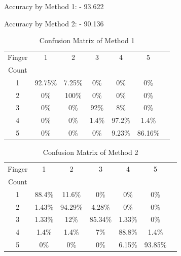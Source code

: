 \documentclass[conference]{IEEEtran}
\begin{document}
Accuracy by Method 1: - 93.622%

Accuracy by Method 2: - 90.136%
%
%

\begin{table}[h]
\caption{Confusion Matrix of Method 1}
\begin{center}
\begin{tabular}{|c|c|c|c|c|c|c|}
\hline
\multicolumn{1}{|c|}{Finger}
& \multicolumn{1}{|c|}{1}
& \multicolumn{1}{|c|}{2}
& \multicolumn{1}{|c|}{3}
& \multicolumn{1}{|c|}{4}
& \multicolumn{1}{|c|}{5}\\
Count &  &  &  &  &\\ \hline
1  &  92.75\%  &  7.25\%  & 0\%  & 0\% & 0\%\\ \hline
2  &  0\%  &  100\%  & 0\%  & 0\% & 0\%\\ \hline
3  &  0\%  &  0\%  & 92\%  & 8\% & 0\%\\ \hline
4  &  0\%  &  0\%  & 1.4\%  & 97.2\% & 1.4\%\\ \hline
5  &  0\%  &  0\%  & 0\%  & 9.23\% & 86.16\%\\ \hline
\end{tabular}
\label{table-tab2}
\end{center}
\end{table}

\begin{table}[h]
\caption{Confusion Matrix of Method 2}
\begin{center}
\begin{tabular}{|c|c|c|c|c|c|c|}
\hline
\multicolumn{1}{|c|}{Finger}
& \multicolumn{1}{|c|}{1}
& \multicolumn{1}{|c|}{2}
& \multicolumn{1}{|c|}{3}
& \multicolumn{1}{|c|}{4}
& \multicolumn{1}{|c|}{5}\\
Count &  &  &  &  &\\ \hline
1  &  88.4\%  &  11.6\%  & 0\%  & 0\% & 0\%\\ \hline
2  &  1.43\%  &  94.29\%  & 4.28\%  & 0\% & 0\%\\ \hline
3  &  1.33\%  &  12\%  & 85.34\%  & 1.33\% & 0\%\\ \hline
4  &  1.4\%  &  1.4\%  & 7\%  & 88.8\% & 1.4\%\\ \hline
5  &  0\%  &  0\%  & 0\%  & 6.15\% & 93.85\%\\ \hline
\end{tabular}
\label{table-tab2}
\end{center}
\end{table}
\end{document}
